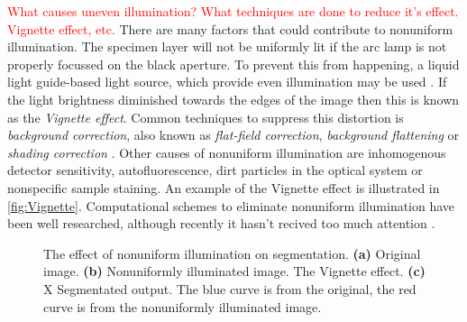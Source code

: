 \begin{definition}
	\textcolor{red}{What causes uneven illumination? What techniques are done to reduce it's effect. Vignette effect, etc.}
	There are many factors that could contribute to nonuniform illumination.
	The specimen layer will not be uniformly lit if the  arc lamp is not properly focussed on the black aperture.
	To prevent this from happening, a liquid light guide-based light source, which provide even illumination may be used \citep{LichtmanConchello2005}.
	If the light brightness diminished towards the edges of the image then this is known as the \textit{Vignette effect}.
	Common techniques to suppress this distortion is \textit{background correction}, also known as \textit{flat-field correction}, \textit{background flattening} or \textit{shading correction} \citep{Danek2012,Fatima2008,Murphy2001}.
	Other causes of nonuniform illumination are inhomogenous detector sensitivity, autofluorescence, dirt particles in the optical system or nonspecific sample staining.
	An example of the Vignette effect is illustrated in \autoref{fig:Vignette}.
	Computational schemes to eliminate nonuniform illumination have been well researched, although recently it hasn't recived too much attention \citep{Young2001,Ghauharali1998,Model2001,Model2001_2}.
	
	\begin{figure}[!t]
		\centering
		\caption{The effect of nonuniform illumination on segmentation. \textbf{(a)} Original image. \textbf{(b)} Nonuniformly illuminated image. The Vignette effect. \textbf{(c)} X Segmentated output. The blue curve is from the original, the red curve is from the nonuniformly illuminated image.}
		\label{fig:illumination}
	\end{figure}
\end{definition}

